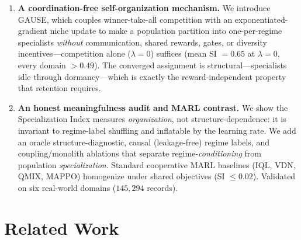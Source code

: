 \documentclass{article}
\begin{document}
\begin{enumerate}
    \item \textbf{A coordination-free self-organization mechanism.} We introduce
    GAUSE, which couples winner-take-all competition with an
    exponentiated-gradient niche update to make a population partition into
    one-per-regime specialists \emph{without} communication, shared rewards,
    gates, or diversity incentives---competition alone ($\lambda = 0$) suffices
    (mean SI $= 0.65$ at $\lambda=0$, every domain $> 0.49$). The converged
    assignment is structural---specialists idle through dormancy---which is
    exactly the reward-independent property that retention requires.

    \item \textbf{An honest meaningfulness audit and MARL contrast.} We show the
    Specialization Index measures \emph{organization}, not structure-dependence:
    it is invariant to regime-label shuffling and inflatable by the learning
    rate. We add an oracle structure-diagnostic, causal (leakage-free) regime
    labels, and coupling/monolith ablations that separate
    regime-\emph{conditioning} from population \emph{specialization}. Standard
    cooperative MARL baselines (IQL, VDN, QMIX, MAPPO) homogenize under shared
    objectives (SI $\le 0.02$). Validated on six real-world domains
    ($145{,}294$ records).
\end{enumerate}

\section{Related Work}
\end{document}
